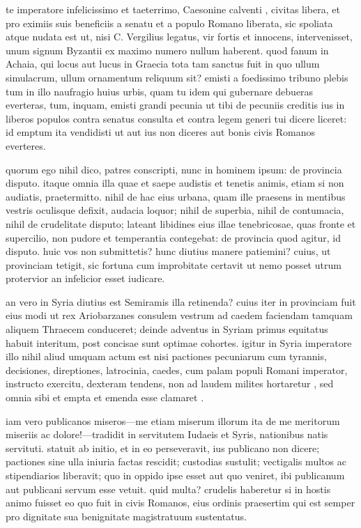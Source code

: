  te imperatore infelicissimo et taeterrimo, Caesonine calventi , civitas libera, et pro eximiis suis beneficiis a senatu et a populo Romano liberata, sic spoliata atque nudata est ut, nisi C. Vergilius legatus, vir fortis et innocens, intervenisset, unum signum Byzantii ex maximo numero nullum haberent. quod fanum in Achaia, qui locus aut lucus in Graecia tota tam sanctus fuit in quo ullum simulacrum, ullum ornamentum reliquum sit? emisti a foedissimo tribuno plebis tum in illo naufragio huius urbis, quam tu idem qui gubernare debueras everteras, tum, inquam, emisti grandi pecunia ut tibi de pecuniis creditis ius in liberos populos contra senatus consulta et contra legem generi tui dicere liceret: id emptum ita vendidisti ut aut ius non diceres aut bonis civis Romanos everteres.

 quorum ego nihil dico, patres conscripti, nunc in hominem ipsum: de provincia disputo. itaque omnia illa quae et saepe audistis et tenetis animis, etiam si non audiatis, praetermitto. nihil de hac eius urbana, quam ille praesens in mentibus vestris oculisque defixit, audacia loquor; nihil de superbia, nihil de contumacia, nihil de crudelitate disputo; lateant libidines eius illae tenebricosae, quas fronte et supercilio, non pudore et temperantia contegebat: de provincia quod agitur, id disputo. huic vos non submittetis? hunc diutius manere patiemini? cuius, ut provinciam tetigit, sic fortuna cum improbitate certavit ut nemo posset utrum protervior an infelicior esset iudicare.

 an vero in Syria diutius est Semiramis illa retinenda? cuius iter in provinciam fuit eius modi ut rex Ariobarzanes consulem vestrum ad caedem faciendam tamquam aliquem Thraecem conduceret; deinde adventus in Syriam primus equitatus habuit interitum, post concisae sunt optimae cohortes. igitur in Syria imperatore illo nihil aliud umquam actum est nisi pactiones pecuniarum cum tyrannis, decisiones, direptiones, latrocinia, caedes, cum palam populi Romani imperator, instructo exercitu, dexteram tendens, non ad laudem milites hortaretur , sed omnia sibi et empta et emenda esse clamaret .

 iam vero publicanos miseros—me etiam miserum illorum ita de me meritorum miseriis ac dolore!—tradidit in servitutem Iudaeis et Syris, nationibus natis servituti. statuit ab initio, et in eo perseveravit, ius publicano non dicere; pactiones sine ulla iniuria factas rescidit; custodias sustulit; vectigalis multos ac stipendiarios liberavit; quo in oppido ipse esset aut quo veniret, ibi publicanum aut publicani servum esse vetuit. quid multa? crudelis haberetur si in hostis animo fuisset eo quo fuit in civis Romanos, eius ordinis praesertim qui est semper pro dignitate sua benignitate magistratuum sustentatus.

